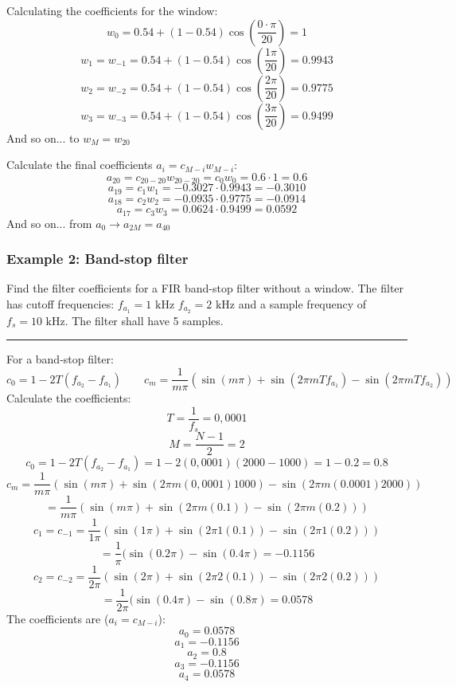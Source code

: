 Calculating the coefficients for the window:
$$w_0=0.54+(1-0.54)\cos\left(\frac{0\cdot\pi}{20}\right)=1$$
$$w_1=w_{-1}=0.54+(1-0.54)\cos\left(\frac{1\pi}{20}\right)=0.9943$$
$$w_2=w_{-2}=0.54+(1-0.54)\cos\left(\frac{2\pi}{20}\right)=0.9775$$
$$w_3=w_{-3}=0.54+(1-0.54)\cos\left(\frac{3\pi}{20}\right)= 0.9499$$
And so on... to $w_M=w_{20}$

Calculate the final coefficients $a_i=c_{M-i}w_{M-i}$:
$$a_{20}=c_{20-20}w_{20-20}=c_{0}w_{0}=0.6\cdot 1=0.6$$
$$a_{19}=c_1w_1=-0.3027\cdot 0.9943=-0.3010$$
$$a_{18}=c_2w_2=-0.0935\cdot 0.9775=-0.0914$$
$$a_{17}=c_3w_3=0.0624\cdot 0.9499=0.0592$$
And so on... from $a_0 \to a_{2M}=a_{40}$

\subsubsection{Example 2: Band-stop filter}
Find the filter coefficients for a FIR band-stop filter without a window. 
The filter has cutoff frequencies: $f_{a_1}=1\text{ kHz }f_{a_2}=2\text{ kHz}$ and a sample frequency of $f_s=10\text{ kHz}$.
The filter shall have 5 samples.

\rule{\textwidth}{0.5pt}

For a band-stop filter:
$$c_0=1-2T(f_{a_2}-f_{a_1})\qquad c_m=\frac{1}{m\pi}(\sin(m\pi)+\sin(2\pi m T f_{a_{1}})-\sin(2\pi m T f_{a_{2}}))$$
Calculate the coefficients:
$$T=\frac{1}{f_s}=0,0001$$
$$M=\frac{N-1}{2}=2$$
$$c_0=1-2T(f_{a_2}-f_{a_1})=1-2(0,0001)(2000-1000)=1-0.2=\boxed{0.8}$$
$$c_m=\frac{1}{m\pi}(\sin(m\pi)+\sin(2\pi m (0,0001) 1000)-\sin(2\pi m (0.0001) 2000))$$
$$=\frac{1}{m\pi}(\sin(m\pi)+\sin(2\pi m (0.1))-\sin(2\pi m (0.2)))$$
$$c_1=c_{-1}=\frac{1}{1\pi}(\sin(1\pi)+\sin(2\pi 1 (0.1))-\sin(2\pi 1 (0.2)))$$
$$=\frac{1}{\pi}(\sin(0.2\pi)-\sin(0.4\pi)=\boxed{-0.1156}$$
$$c_2=c_{-2}=\frac{1}{2\pi}(\sin(2\pi)+\sin(2\pi 2 (0.1))-\sin(2\pi 2 (0.2)))$$
$$=\frac{1}{2\pi}(\sin(0.4\pi)-\sin(0.8\pi)=\boxed{0.0578}$$
The coefficients are ($a_i=c_{M-i}$):
$$a_0=0.0578$$
$$a_1=-0.1156$$
$$a_2=0.8$$
$$a_3=-0.1156$$
$$a_4=0.0578$$
